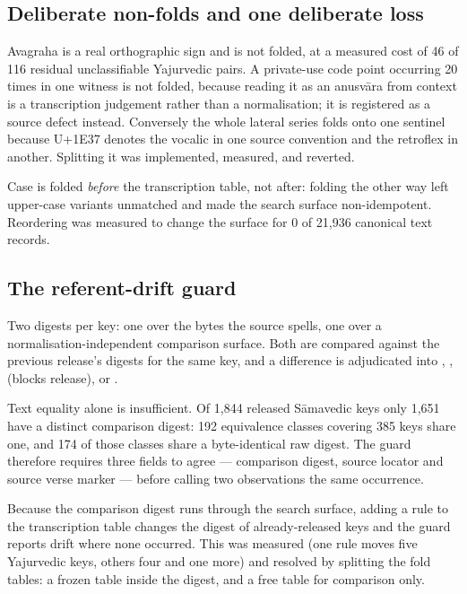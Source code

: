 \subsection{Deliberate non-folds and one deliberate loss}

Avagraha is a real orthographic sign and is not folded, at a measured cost of 46 of
116 residual unclassifiable Yajurvedic pairs. A private-use code point occurring 20
times in one witness is not folded, because reading it as an anusv\=ara from context
is a transcription judgement rather than a normalisation; it is registered as a
source defect instead. Conversely the whole lateral series folds onto one sentinel
because U+1E37 denotes the vocalic  in one source convention and the
retroflex  in another. Splitting it was implemented, measured, and
reverted.

Case is folded \emph{before} the transcription table, not after: folding the other
way left upper-case variants unmatched and made the search surface non-idempotent.
Reordering was measured to change the surface for 0 of 21{,}936 canonical text
records.

\subsection{The referent-drift guard}

Two digests per key: one over the bytes the source spells, one over a
normalisation-independent comparison surface. Both are compared against the previous
release's digests for the same key, and a difference is adjudicated into
, ,
 (blocks release),  or
.

Text equality alone is insufficient. Of 1{,}844 released S\=amavedic keys only
1{,}651 have a distinct comparison digest: 192 equivalence classes covering 385 keys
share one, and 174 of those classes share a byte-identical raw digest. The guard
therefore requires three fields to agree --- comparison digest, source locator and
source verse marker --- before calling two observations the same occurrence.

Because the comparison digest runs through the search surface, adding a rule to the
transcription table changes the digest of already-released keys and the guard reports
drift where none occurred. This was measured (one rule moves five Yajurvedic keys,
others four and one more) and resolved by splitting the fold tables: a frozen table
inside the digest, and a free table for comparison only.
